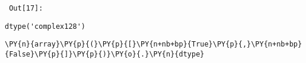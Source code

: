         {\par%
        \vspace{-1\smallerfontscale}%
        \noindent%
        \begin{minipage}{\cellleftmargin}%
    \hfill%
    {\smaller%
    \tt%
    \color{nbframe-out-prompt}%
    Out[17]:}%
    \hspace{\inputpadding}%
    \hspace{0em}%
    \hspace{3pt}%
    \end{minipage}%
        }%
    \begin{addmargin}[\cellleftmargin]{0em}%
    {\smaller%
    \vspace{-1\smallerfontscale}%
    
    
    
    \begin{verbatim}
dtype('complex128')
    \end{verbatim}

    
}%
    \end{addmargin}%

{\par%
\vspace{-1\baselineskip}%
}%
\begin{notebookcell}[18]%
\begin{addmargin}[\cellleftmargin]{0em}%
{\smaller%
\par%
%
\vspace{-1\smallerfontscale}%
\begin{Verbatim}[commandchars=\\\{\}]
\PY{n}{array}\PY{p}{(}\PY{p}{[}\PY{n+nb+bp}{True}\PY{p}{,}\PY{n+nb+bp}{False}\PY{p}{]}\PY{p}{)}\PY{o}{.}\PY{n}{dtype}
\end{Verbatim}
%
\par%
\vspace{-1\smallerfontscale}}%
\end{addmargin}
\end{notebookcell}

\par\vspace{1\smallerfontscale}%
    
